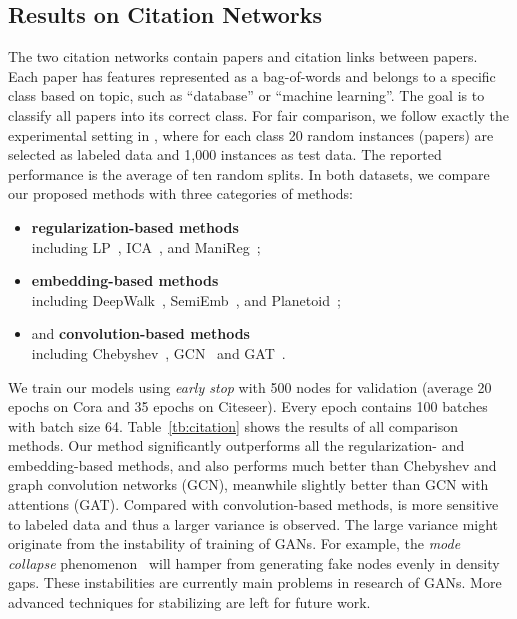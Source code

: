 \subsection{Results on Citation Networks}\label{citation}
The two citation networks contain papers and citation links between papers.
Each paper has features represented as a bag-of-words and belongs to a specific class based on topic, such as ``database'' or ``machine learning''.
The goal is to classify all papers into its correct class.
For fair comparison, we follow exactly the experimental setting in \cite{yang2016revisiting}, where for each class 20 random instances (papers) are selected as labeled data and 1,000 instances as test data. The reported performance is the average of ten random splits.
In both datasets, we compare our proposed methods with three categories of methods:
\begin{itemize}
	\item \textbf{regularization-based methods} \\ including LP~\cite{zhu2002learning}, ICA~\cite{lu2003link}, and ManiReg~\cite{belkin2006manifold};
	\item \textbf{embedding-based methods} \\ including DeepWalk~\cite{Perozzi:14KDD}, SemiEmb~\cite{weston2012deep}, and Planetoid~\cite{yang2016revisiting};
	\item and \textbf{convolution-based methods}\\ including Chebyshev~\cite{defferrard2016convolutional}, GCN~\cite{kipf2016semi} and GAT~\cite{DBLP:journals/corr/abs-1710-10903}.
\end{itemize}
    
We train our models using {\it early stop} with 500 nodes for validation (average 20 epochs on Cora and 35 epochs on Citeseer). Every epoch contains 100 batches with batch size 64.
Table~\ref{tb:citation} shows the results of all comparison methods. Our method significantly outperforms all the regularization- and embedding-based methods, and also performs much better than Chebyshev and graph convolution networks (GCN), meanwhile slightly better than GCN with attentions (GAT). Compared with convolution-based methods, \smodel is more sensitive to labeled data and thus a larger variance is observed. The large variance might originate from the instability of training of GANs. For example, the \textit{mode collapse} phenomenon~\cite{theis2016note} will hamper \smodel from generating fake nodes evenly in density gaps. 
These instabilities are currently main problems in research of GANs. More advanced techniques for stabilizing \smodel are left for future work.

